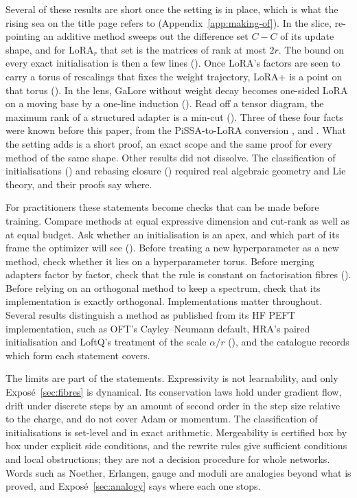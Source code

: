 Several of these results are short once the setting is in place, which is what the rising sea on the title page refers to (Appendix~\ref{app:making-of}). In the slice, re-pointing an additive method sweeps out the difference set $C-C$ of its update shape, and for LoRA$_r$ that set is the matrices of rank at most $2r$. The bound on every exact initialisation is then a few lines (). Once LoRA's factors are seen to carry a torus of rescalings that fixes the weight trajectory, LoRA+ is a point on that torus (). In the lens, GaLore without weight decay becomes one-sided LoRA on a moving base by a one-line induction (). Read off a tensor diagram, the maximum rank of a structured adapter is a min-cut (). Three of these four facts were known before this paper, from the PiSSA-to-LoRA conversion \citep{meng2024pissa}, \citet{schulman2025lora} and \citet{xtorrobahennigen2025duality}. What the setting adds is a short proof, an exact scope and the same proof for every method of the same shape. Other results did not dissolve. The classification of initialisations () and rebasing closure () required real algebraic geometry and Lie theory, and their proofs say where.

For practitioners these statements become checks that can be made before training. Compare methods at equal expressive dimension and cut-rank as well as at equal budget. Ask whether an initialisation is an apex, and which part of its frame the optimizer will see (). Before treating a new hyperparameter as a new method, check whether it lies on a hyperparameter torus. Before merging adapters factor by factor, check that the rule is constant on factorisation fibres (). Before relying on an orthogonal method to keep a spectrum, check that its implementation is exactly orthogonal. Implementations matter throughout. Several results distinguish a method as published from its HF PEFT implementation, such as OFT's Cayley--Neumann default, HRA's paired initialisation and LoftQ's treatment of the scale $\alpha/r$ (), and the catalogue records which form each statement covers.

The limits are part of the statements. Expressivity is not learnability, and only Exposé~\ref{sec:fibres} is dynamical. Its conservation laws hold under gradient flow, drift under discrete steps by an amount of second order in the step size relative to the charge, and do not cover Adam or momentum. The classification of initialisations is set-level and in exact arithmetic. Mergeability is certified box by box under explicit side conditions, and the rewrite rules give sufficient conditions and local obstructions; they are not a decision procedure for whole networks. Words such as Noether, Erlangen, gauge and moduli are analogies beyond what is proved, and Exposé~\ref{sec:analogy} says where each one stops.


